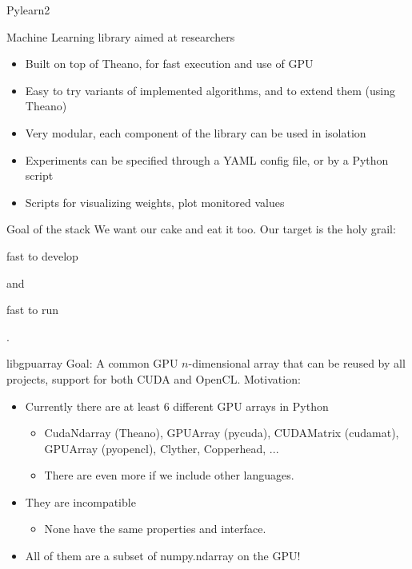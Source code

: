 \documentclass[utf8x,xcolor=pdftex,dvipsnames,table]{beamer}
\begin{document}
\begin{frame}{Pylearn2}

  Machine Learning library aimed at researchers

  \begin{itemize}
    \item Built on top of Theano, for fast execution and use of GPU
    \item Easy to try variants of implemented algorithms, and to extend them (using Theano)
    \item Very modular, each component of the library can be used in isolation
    \item Experiments can be specified through a YAML config file, or by a Python script
    \item Scripts for visualizing weights, plot monitored values
  \end{itemize}
\end{frame}


\begin{frame}{Goal of the stack}
We want our cake and eat it too.\newline
Our target is the holy grail: \begin{bf}fast to develop\end{bf} and \begin{bf}fast to run\end{bf}.
\end{frame}


\begin{frame}{libgpuarray}
  Goal: A common GPU $n$-dimensional array that can be reused by all projects, support for both CUDA and OpenCL.
  \newline \newline
  Motivation:
  \begin{itemize}
  \item Currently there are at least 6 different GPU arrays in Python
    \begin{itemize}
    \item CudaNdarray (Theano), GPUArray (pycuda), CUDAMatrix (cudamat), GPUArray (pyopencl), Clyther, Copperhead, ...
    \item There are even more if we include other languages.
    \end{itemize}
  \item They are incompatible
    \begin{itemize}
    \item None have the same properties and interface.
    \end{itemize}
  \item All of them are a subset of numpy.ndarray on the GPU!
  \end{itemize}
\end{frame}
\end{document}
